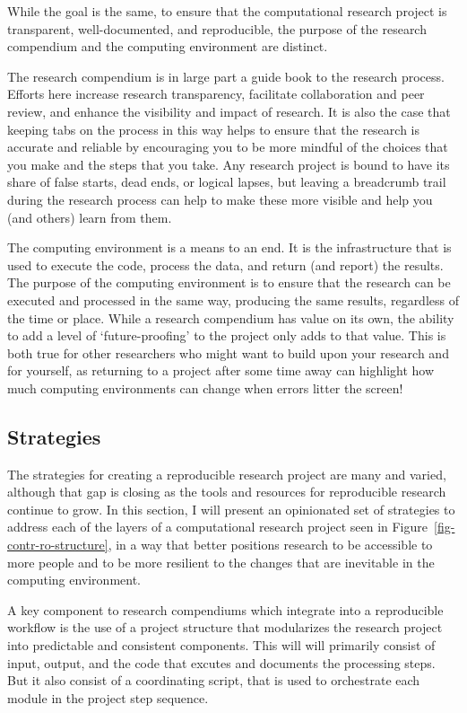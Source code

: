 \documentclass[
  letterpaper,
]{latex/krantz}
\theoremstyle{definition}
\theoremstyle{remark}
\begin{document}
While the goal is the same, to ensure that the computational research
project is transparent, well-documented, and reproducible, the purpose
of the research compendium and the computing environment are distinct.

The research compendium is in large part a guide book to the research
process. Efforts here increase research transparency, facilitate
collaboration and peer review, and enhance the visibility and impact of
research. It is also the case that keeping tabs on the process in this
way helps to ensure that the research is accurate and reliable by
encouraging you to be more mindful of the choices that you make and the
steps that you take. Any research project is bound to have its share of
false starts, dead ends, or logical lapses, but leaving a breadcrumb
trail during the research process can help to make these more visible
and help you (and others) learn from them.

The computing environment is a means to an end. It is the infrastructure
that is used to execute the code, process the data, and return (and
report) the results. The purpose of the computing environment is to
ensure that the research can be executed and processed in the same way,
producing the same results, regardless of the time or place. While a
research compendium has value on its own, the ability to add a level of
`future-proofing' to the project only adds to that value. This is both
true for other researchers who might want to build upon your research
and for yourself, as returning to a project after some time away can
highlight how much computing environments can change when errors litter
the screen!

\subsection{Strategies}\label{sec-contr-ro-strategies}

The strategies for creating a reproducible research project are many and
varied, although that gap is closing as the tools and resources for
reproducible research continue to grow. In this section, I will present
an opinionated set of strategies to address each of the layers of a
computational research project seen in
Figure~\ref{fig-contr-ro-structure}, in a way that better positions
research to be accessible to more people and to be more resilient to the
changes that are inevitable in the computing environment.

A key component to research compendiums which integrate into a
reproducible workflow is the use of a project structure that modularizes
the research project into predictable and consistent components. This
will will primarily consist of input, output, and the code that excutes
and documents the processing steps. But it also consist of a
coordinating script, that is used to orchestrate each module in the
project step sequence.
\end{document}
